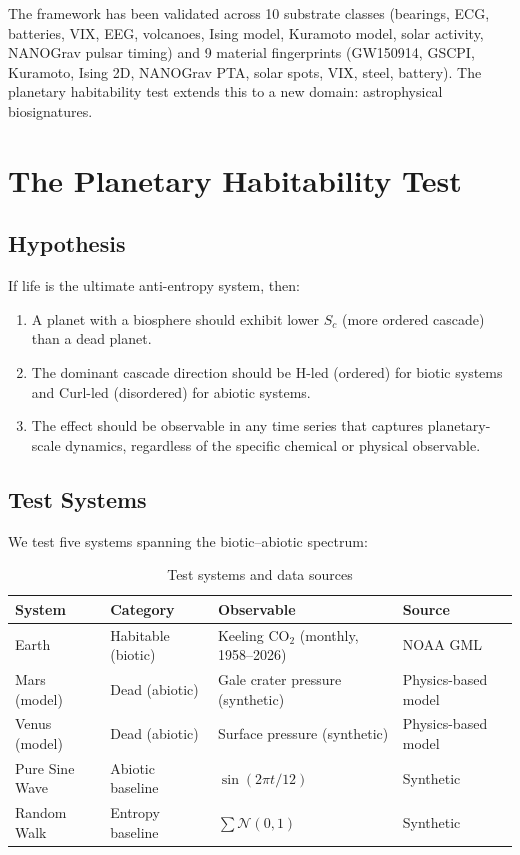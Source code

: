 \documentclass[12pt,a4paper]{article}
\begin{document}
The framework has been validated across 10 substrate classes (bearings,
ECG, batteries, VIX, EEG, volcanoes, Ising model, Kuramoto model, solar
activity, NANOGrav pulsar timing) and 9 material fingerprints
(GW150914, GSCPI, Kuramoto, Ising 2D, NANOGrav PTA, solar spots, VIX,
steel, battery). The planetary habitability test extends this to a new
domain: astrophysical biosignatures.

\section{The Planetary Habitability Test}

\subsection{Hypothesis}

If life is the ultimate anti-entropy system, then:

\begin{enumerate}[leftmargin=*]
  \item A planet with a biosphere should exhibit lower $S_c$ (more ordered
    cascade) than a dead planet.
  \item The dominant cascade direction should be H-led (ordered) for
    biotic systems and Curl-led (disordered) for abiotic systems.
  \item The effect should be observable in any time series that captures
    planetary-scale dynamics, regardless of the specific chemical or
    physical observable.
\end{enumerate}

\subsection{Test Systems}

We test five systems spanning the biotic--abiotic spectrum:

\begin{table}[htbp]
  \centering
  \caption{Test systems and data sources}
  \label{tab:systems}
  \begin{tabular}{llll}
    \toprule
    \textbf{System} & \textbf{Category} &
    \textbf{Observable} & \textbf{Source} \\
    \midrule
    Earth & Habitable (biotic) &
      Keeling CO$_2$ (monthly, 1958--2026) & NOAA GML \\
    Mars (model) & Dead (abiotic) &
      Gale crater pressure (synthetic) & Physics-based model \\
    Venus (model) & Dead (abiotic) &
      Surface pressure (synthetic) & Physics-based model \\
    Pure Sine Wave & Abiotic baseline &
      $\sin(2\pi t/12)$ & Synthetic \\
    Random Walk & Entropy baseline &
      $\sum \mathcal{N}(0,1)$ & Synthetic \\
    \bottomrule
  \end{tabular}
\end{table}
\end{document}
